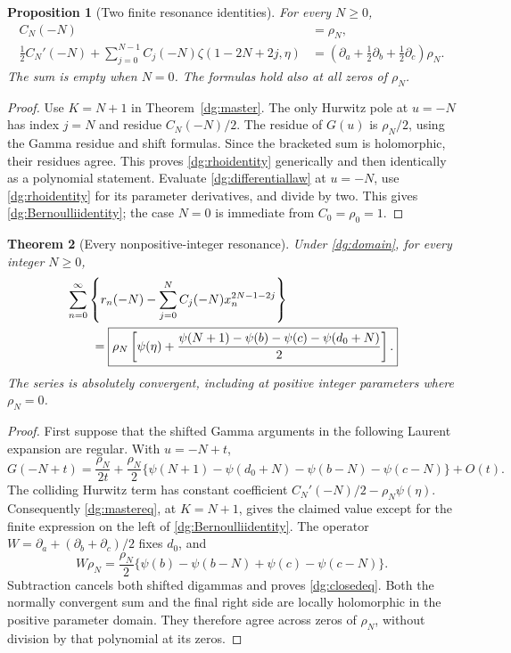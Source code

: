 \documentclass[11pt,a4paper]{article}
\numberwithin{equation}{section}
\newtheorem{theorem}{Theorem}[section]
\newtheorem{proposition}[theorem]{Proposition}
\theoremstyle{definition}
\theoremstyle{remark}
\begin{document}
\begin{proposition}[Two finite resonance identities]\label{dg:residues}
For every $N\ge0$,
\begin{align}
 C_N(-N)&=\rho_N,\label{dg:rhoidentity}\\
 \frac12C_N'(-N)+
 \sum_{j=0}^{N-1}C_j(-N)\zeta(1-2N+2j,\eta)
 &=\left(\partial_a+\tfrac12\partial_b+\tfrac12\partial_c\right)\rho_N.
 \label{dg:Bernoulliidentity}
\end{align}
The sum is empty when $N=0$. The formulas hold also at all zeros of
$\rho_N$.
\end{proposition}
\begin{proof}
Use $K=N+1$ in Theorem~\ref{dg:master}. The only Hurwitz pole at
$u=-N$ has index $j=N$ and residue $C_N(-N)/2$. The residue of
$G(u)$ is $\rho_N/2$, using the Gamma residue and shift formulas.
Since the bracketed sum is holomorphic, their residues agree. This
proves \eqref{dg:rhoidentity} generically and then identically as a
polynomial statement. Evaluate \eqref{dg:differentiallaw} at $u=-N$,
use \eqref{dg:rhoidentity} for its parameter derivatives, and divide
by two. This gives \eqref{dg:Bernoulliidentity}; the case $N=0$ is
immediate from $C_0=\rho_0=1$.
\end{proof}

\begin{theorem}[Every nonpositive-integer resonance]\label{dg:closed}
Under \eqref{dg:domain}, for every integer $N\ge0$,
\begin{align}
 &\sum_{n=0}^{\infty}\left\{r_n(-N)-
             \sum_{j=0}^{N}C_j(-N)x_n^{2N-1-2j}\right\}\notag\\
 &\qquad=\boxed{\rho_N\left[
   \psi(\eta)+\frac{\psi(N+1)-\psi(b)-\psi(c)-\psi(d_0+N)}2
                    \right].}\label{dg:closedeq}
\end{align}
The series is absolutely convergent, including at positive integer
parameters where $\rho_N=0$.
\end{theorem}
\begin{proof}
First suppose that the shifted Gamma arguments in the following
Laurent expansion are regular. With $u=-N+t$,
\[
 G(-N+t)=\frac{\rho_N}{2t}
 +\frac{\rho_N}{2}
   \{\psi(N+1)-\psi(d_0+N)-\psi(b-N)-\psi(c-N)\}+O(t).
\]
The colliding Hurwitz term has constant coefficient
$C_N'(-N)/2-\rho_N\psi(\eta)$. Consequently
\eqref{dg:mastereq}, at $K=N+1$, gives the claimed value except for
the finite expression on the left of \eqref{dg:Bernoulliidentity}.
The operator $W=\partial_a+(\partial_b+\partial_c)/2$ fixes $d_0$, and
\[
 W\rho_N=\frac{\rho_N}{2}
   \{\psi(b)-\psi(b-N)+\psi(c)-\psi(c-N)\}.
\]
Subtraction cancels both shifted digammas and proves
\eqref{dg:closedeq}. Both the normally convergent sum and the final
right side are locally holomorphic in the positive parameter domain.
They therefore agree across zeros of $\rho_N$, without division by
that polynomial at its zeros.
\end{proof}
\end{document}
